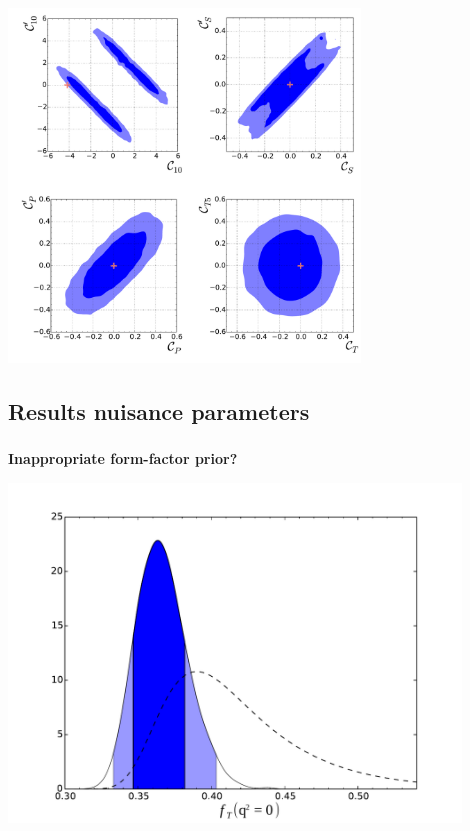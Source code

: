 \documentclass[english]{beamer}
\newcommand{\slide}[2][t]{\begin{frame}[#1] \frametitle{\insertsubsectionhead} #2 \end{frame}}
\begin{document}
\slide{

    \begin{center}
        \includegraphics[width=0.7\textwidth]{figures/Wilson_coeff_2d}
    \end{center}

}

\subsection{Results nuisance parameters}

\slide[t]{

    {\large\textbf{Inappropriate form-factor prior?}}

    \begin{center}
        \includegraphics[width=0.9\textwidth]{figures/FF_ft0}
    \end{center}

}
\end{document}
